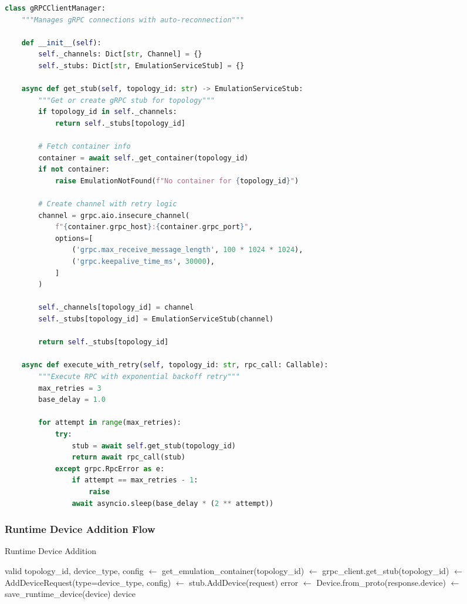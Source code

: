 \documentclass[10pt,a4paper]{article}
\begin{document}
\begin{lstlisting}[language=python, caption=Async gRPC Client with Reconnection]
class gRPCClientManager:
    """Manages gRPC connections with auto-reconnection"""

    def __init__(self):
        self._channels: Dict[str, Channel] = {}
        self._stubs: Dict[str, EmulationServiceStub] = {}

    async def get_stub(self, topology_id: str) -> EmulationServiceStub:
        """Get or create gRPC stub for topology"""
        if topology_id in self._channels:
            return self._stubs[topology_id]

        # Fetch container info
        container = await self._get_container(topology_id)
        if not container:
            raise EmulationNotFound(f"No container for {topology_id}")

        # Create channel with retry logic
        channel = grpc.aio.insecure_channel(
            f"{container.grpc_host}:{container.grpc_port}",
            options=[
                ('grpc.max_receive_message_length', 100 * 1024 * 1024),
                ('grpc.keepalive_time_ms', 30000),
            ]
        )

        self._channels[topology_id] = channel
        self._stubs[topology_id] = EmulationServiceStub(channel)

        return self._stubs[topology_id]

    async def execute_with_retry(self, topology_id: str, rpc_call: Callable):
        """Execute RPC with exponential backoff retry"""
        max_retries = 3
        base_delay = 1.0

        for attempt in range(max_retries):
            try:
                stub = await self.get_stub(topology_id)
                return await rpc_call(stub)
            except grpc.RpcError as e:
                if attempt == max_retries - 1:
                    raise
                await asyncio.sleep(base_delay * (2 ** attempt))
\end{lstlisting}

\subsubsection{Runtime Device Addition Flow}

\begin{algorithm}
\caption{Runtime Device Addition}
\begin{algorithmic}[H]
\REQUIRE valid topology\_id, device\_type, config
 $\leftarrow$ get\_emulation\_container(topology\_id)
 $\leftarrow$ grpc\_client.get\_stub(topology\_id)
 $\leftarrow$ AddDeviceRequest(type=device\_type, config)
 $\leftarrow$ stub.AddDevice(request)
 \THEN
    \RETURN error
\ENDIF
{} $\leftarrow$ Device.from\_proto(response.device)
 $\leftarrow$ save\_runtime\_device(device)
\RETURN device
\end{algorithmic}
\end{algorithm}
\end{document}
